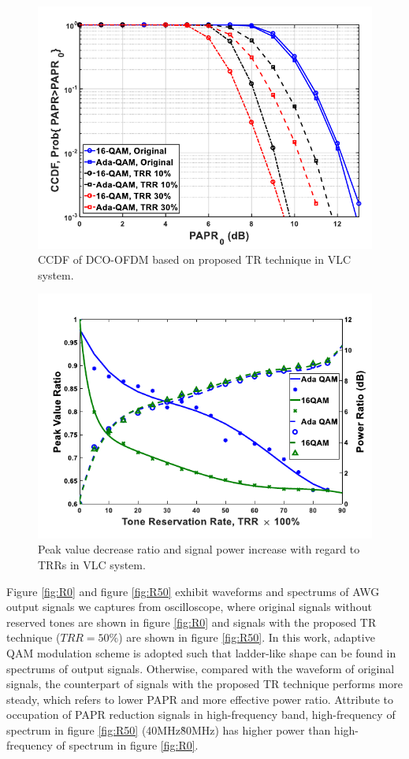 \documentclass[9pt,twocolumn,twoside]{osajnl}
\begin{document}
\begin{figure}[t]
  \centering
  \includegraphics[width=\linewidth]{figures/CCDF.pdf}
  \caption{CCDF of DCO-OFDM based on proposed TR technique in VLC system.}
  \label{fig:CCDF}
\end{figure}

\begin{figure}[t]
  \centering
  \includegraphics[width=\linewidth]{figures/PeakPower.pdf}
  \caption{Peak value decrease ratio and signal power increase with regard to TRRs in VLC system.}
  \label{fig:PeakPower}
\end{figure}

Figure \ref{fig:R0} and figure \ref{fig:R50} exhibit waveforms and spectrums of AWG output signals we captures from oscilloscope, where original signals without reserved tones are shown in figure \ref{fig:R0} and signals with the proposed TR technique ($TRR=50\%$) 
are shown in figure \ref{fig:R50}. In this work, adaptive QAM modulation scheme is adopted such that ladder-like shape can be found in spectrums of output signals. Otherwise, compared with the waveform of original signals, the counterpart of signals with the proposed 
TR technique performs more steady, which refers to lower PAPR and more effective power ratio. Attribute to occupation of PAPR reduction signals in high-frequency band, high-frequency of spectrum in figure \ref{fig:R50} (40MHz\~80MHz) has higher power than high-frequency 
of spectrum in figure \ref{fig:R0}.
\end{document}
